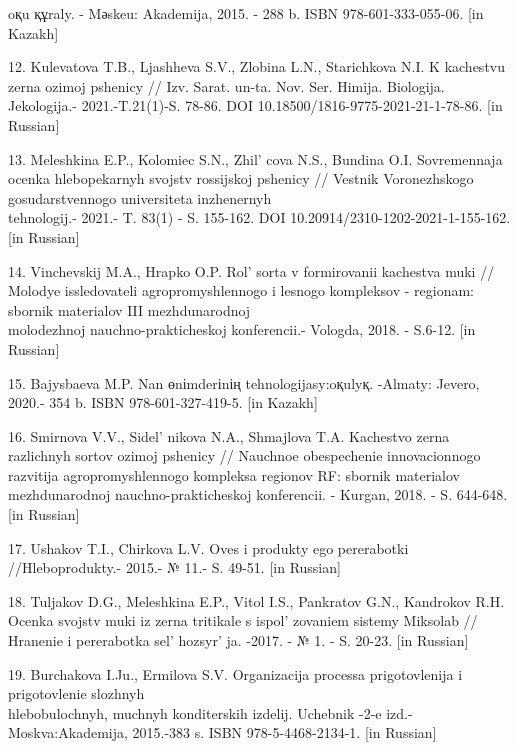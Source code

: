 \begin{references}
oқu құraly. - Mәskeu: Akademija, 2015. - 288 b. ISBN 978-601-333-055-06.
{[}in Kazakh{]}

12. Kulevatova T.B., Ljashheva S.V., Zlobina L.N., Starichkova N.I. K
kachestvu zerna ozimoj pshenicy // Izv. Sarat. un-ta. Nov. Ser. Himija.
Biologija. Jekologija.- 2021.-T.21(1)-S. 78-86. DOI
10.18500/1816-9775-2021-21-1-78-86. {[}in Russian{]}

13. Meleshkina E.P., Kolomiec S.N., Zhil' cova N.S.,
Bundina O.I. Sovremennaja ocenka hlebopekarnyh svojstv rossijskoj
pshenicy // Vestnik Voronezhskogo gosudarstvennogo universiteta
inzhenernyh \\tehnologij.- 2021.- T. 83(1) - S. 155-162.
DOI 10.20914/2310-1202-2021-1-155-162. {[}in Russian{]}

14. Vinchevskij M.A., Hrapko O.P. Rol'{} sorta v
formirovanii kachestva muki // Molodye issledovateli agropromyshlennogo
i lesnogo kompleksov - regionam: sbornik materialov III mezhdunarodnoj\\
molodezhnoj nauchno-prakticheskoj konferencii.- Vologda, 2018. - S.6-12.
{[}in Russian{]}

15. Bajysbaeva M.P. Nan өnіmderіnің tehnologijasy:oқulyқ. -Almaty:
Jevero, 2020.- 354 b. ISBN 978-601-327-419-5. {[}in Kazakh{]}

16. Smirnova V.V., Sidel' nikova N.A., Shmajlova T.A.
Kachestvo zerna razlichnyh sortov ozimoj pshenicy // Nauchnoe
obespechenie innovacionnogo razvitija agropromyshlennogo kompleksa
regionov RF: sbornik materialov mezhdunarodnoj nauchno-prakticheskoj
konferencii. - Kurgan, 2018. - S. 644-648. {[}in Russian{]}

17. Ushakov T.I., Chirkova L.V. Oves i produkty ego pererabotki
//Hleboprodukty.- 2015.- № 11.- S. 49-51. {[}in Russian{]}

18. Tuljakov D.G., Meleshkina E.P., Vitol I.S., Pankratov G.N.,
Kandrokov R.H. Ocenka svojstv muki iz zerna tritikale s
ispol' zovaniem sistemy Miksolab // Hranenie i
pererabotka sel' hozsyr' ja. -2017. - № 1.
- S. 20-23. {[}in Russian{]}

19. Burchakova I.Ju., Ermilova S.V. Organizacija processa prigotovlenija
i prigotovlenie slozhnyh \\hlebobulochnyh, muchnyh konditerskih izdelij.
Uchebnik -2-e izd.-Moskva:Akademija, 2015.-383 s. ISBN
978-5-4468-2134-1. {[}in Russian{]}
\end{references}

